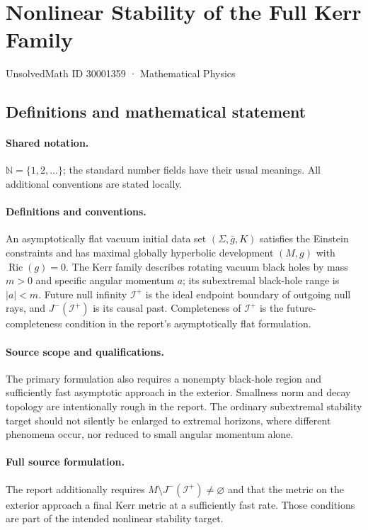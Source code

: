 \documentclass[11pt]{article}
\begin{document}
\setcounter{section}{30001358}
\section{Nonlinear Stability of the Full Kerr Family}\label{30001359}
{\small UnsolvedMath ID 30001359 · Mathematical Physics}
\subsection{Definitions and mathematical statement}

\paragraph{Shared notation.}$\mathbb N=\{1,2,\ldots\}$; the standard number fields have their usual meanings. All additional conventions are stated locally.


\paragraph{Definitions and conventions.} An asymptotically flat vacuum initial data set $(\Sigma,\bar g,K)$ satisfies the Einstein constraints and has maximal globally hyperbolic development $(M,g)$ with $\operatorname{Ric}(g)=0$. The Kerr family describes rotating vacuum black holes by mass $m>0$ and specific angular momentum $a$; its subextremal black-hole range is $|a|<m$. Future null infinity $\mathcal I^+$ is the ideal endpoint boundary of outgoing null rays, and $J^-(\mathcal I^+)$ is its causal past. Completeness of $\mathcal I^+$ is the future-completeness condition in the report's asymptotically flat formulation.

\paragraph{Source scope and qualifications.} The primary formulation also requires a nonempty black-hole region and sufficiently fast asymptotic approach in the exterior. Smallness norm and decay topology are intentionally rough in the report. The ordinary subextremal stability target should not silently be enlarged to extremal horizons, where different phenomena occur, nor reduced to small angular momentum alone.

\paragraph{Full source formulation.} The report additionally requires $M\setminus J^-(\mathcal I^+)\ne\varnothing$ and that the metric on the exterior approach a final Kerr metric at a sufficiently fast rate. Those conditions are part of the intended nonlinear stability target.
\end{document}
